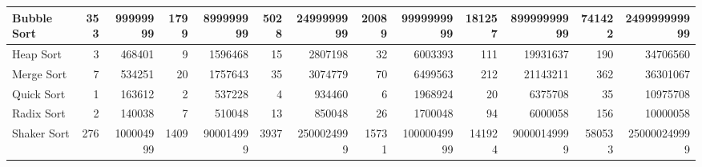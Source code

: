 \documentclass{article}
\begin{document}
\begin{table}[H]
\begin{adjustbox}{width=\columnwidth,center}
\begin{tabular}{|l|rrrrrrrrrrrr|}
Bubble Sort                        & \multicolumn{1}{r|}{353}          & \multicolumn{1}{r|}{99999999}   & \multicolumn{1}{r|}{1799}         & \multicolumn{1}{r|}{899999999}  & \multicolumn{1}{r|}{5028}         & \multicolumn{1}{r|}{2499999999} & \multicolumn{1}{r|}{20089}        & \multicolumn{1}{r|}{9999999999}  & \multicolumn{1}{r|}{181257}       & \multicolumn{1}{r|}{89999999999} & \multicolumn{1}{r|}{741422}       & 249999999999                    \\ \hline
Heap Sort                          & \multicolumn{1}{r|}{3}            & \multicolumn{1}{r|}{468401}     & \multicolumn{1}{r|}{9}            & \multicolumn{1}{r|}{1596468}    & \multicolumn{1}{r|}{15}           & \multicolumn{1}{r|}{2807198}    & \multicolumn{1}{r|}{32}           & \multicolumn{1}{r|}{6003393}     & \multicolumn{1}{r|}{111}          & \multicolumn{1}{r|}{19931637}    & \multicolumn{1}{r|}{190}          & 34706560                        \\ \hline
Merge Sort                         & \multicolumn{1}{r|}{7}            & \multicolumn{1}{r|}{534251}     & \multicolumn{1}{r|}{20}           & \multicolumn{1}{r|}{1757643}    & \multicolumn{1}{r|}{35}           & \multicolumn{1}{r|}{3074779}    & \multicolumn{1}{r|}{70}           & \multicolumn{1}{r|}{6499563}     & \multicolumn{1}{r|}{212}          & \multicolumn{1}{r|}{21143211}    & \multicolumn{1}{r|}{362}          & 36301067                        \\ \hline
Quick Sort & \multicolumn{1}{r|}{1}            & \multicolumn{1}{r|}{163612}     & \multicolumn{1}{r|}{2}            & \multicolumn{1}{r|}{537228}     & \multicolumn{1}{r|}{4}            & \multicolumn{1}{r|}{934460}     & \multicolumn{1}{r|}{6}            & \multicolumn{1}{r|}{1968924}     & \multicolumn{1}{r|}{20}           & \multicolumn{1}{r|}{6375708}     & \multicolumn{1}{r|}{35}           & 10975708                        \\ \hline
Radix Sort                         & \multicolumn{1}{r|}{2}            & \multicolumn{1}{r|}{140038}     & \multicolumn{1}{r|}{7}            & \multicolumn{1}{r|}{510048}     & \multicolumn{1}{r|}{13}           & \multicolumn{1}{r|}{850048}     & \multicolumn{1}{r|}{26}           & \multicolumn{1}{r|}{1700048}     & \multicolumn{1}{r|}{94}           & \multicolumn{1}{r|}{6000058}     & \multicolumn{1}{r|}{156}          & 10000058                        \\ \hline
Shaker Sort                        & \multicolumn{1}{r|}{276}          & \multicolumn{1}{r|}{100004999}  & \multicolumn{1}{r|}{1409}         & \multicolumn{1}{r|}{900014999}  & \multicolumn{1}{r|}{3937}         & \multicolumn{1}{r|}{2500024999} & \multicolumn{1}{r|}{15731}        & \multicolumn{1}{r|}{10000049999} & \multicolumn{1}{r|}{141924}       & \multicolumn{1}{r|}{90000149999} & \multicolumn{1}{r|}{580533}       & 250000249999                    \\ \hline

\end{tabular}
\end{adjustbox}
\end{table}
\end{document}
